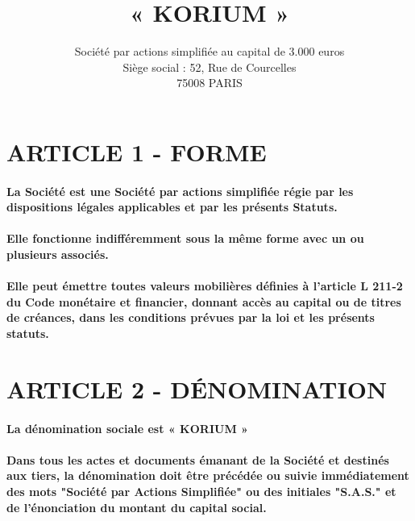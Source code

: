 \documentclass[a4paper, 11pt]{article}
\begin{document}
\title{« KORIUM »}
\author{
  Société par actions simplifiée au capital de 3.000 euros\\
  Siège social : 52, Rue de Courcelles\\
  75008 PARIS\\
}

\maketitle

\pagebreak

\section*{ARTICLE 1 - FORME}

\paragraph{
  La Société est une Société par actions simplifiée régie par les dispositions  légales applicables et par les présents Statuts.
}

\paragraph{
  Elle fonctionne indifféremment sous la même forme avec un ou plusieurs associés.
}

\paragraph{
  Elle peut émettre toutes valeurs mobilières définies à l'article L 211-2 du Code monétaire et financier, donnant accès au capital ou de titres de créances, dans les conditions prévues par la loi et les présents statuts.
}

\section*{ARTICLE 2 - DÉNOMINATION}

\paragraph{
  La dénomination sociale est « KORIUM »
}

\paragraph{
  Dans tous les actes et documents émanant de la Société et destinés aux tiers, la dénomination doit être précédée ou suivie immédiatement des mots "Société par Actions Simplifiée" ou des initiales "S.A.S." et de l'énonciation du montant du capital social.
}
\end{document}
